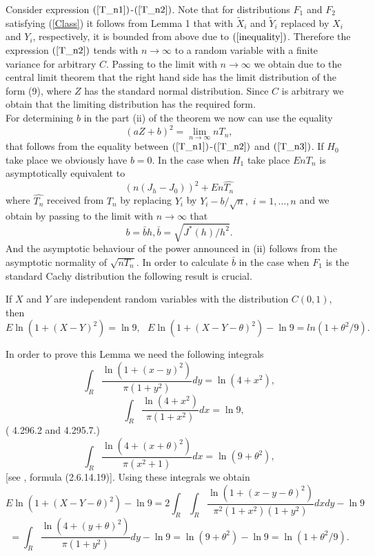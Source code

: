 \documentclass{svproc}
\begin{document}
Consider expression $(\ref{T_n1})$-$(\ref{T_n2})$. Note  that for distributions $F_1$ and $F_2$  satisfying (\ref{Class}) it follows from Lemma 1 that  with $\tilde X_i$ and $\tilde Y_i$ replaced by $X_i$ and $Y_i$, respectively, it is bounded from above due to  $(\ref{inequality})$. Therefore  the expression $(\ref{T_n2})$ tends with $n\to \infty$ to a random variable with a finite variance for arbitrary $C$.
Passing to the limit with $n\to \infty$ we obtain due to the central limit theorem that the right hand side has the limit distribution of the form (9), where  $Z$ has the standard normal distribution.  Since $C$ is arbitrary we obtain that the limiting distribution has the required form. \\
For determining $b$ in the part (ii) of the theorem  we now can use the equality
 \begin{equation}\label{identity}
 (aZ+b)^2=\lim_{n \to \infty}
 nT_n,
 \end{equation}
 that follows from  the equality between $(\ref{T_n1})$-$(\ref{T_n2})$ and $(\ref{T_n3})$. If $H_0$ take place we obviously have $b=0$. In the case when $H_1$ take place $EnT_n$ is asymptotically equivalent to  
$$
(n(J_h - J_0))^2+En\hat{T_n}
$$
where $\hat{T_n}$ received from $T_n$ by replacing  $Y_i$ by $Y_i - b/\sqrt{n},$ $i=1,\dots,n$
and we obtain by passing to the limit with $n\to\infty$ that 
$$
b= \bar bh, 
\bar b =\sqrt{J^*(h)/h^2}.
$$ 
 And the asymptotic behaviour of the power announced in (ii) follows from the asymptotic normality of $\sqrt{nT_n}$.
In order to calculate $\bar b$ in the case when $F_1$ is the standard Cachy distribution
 the following result is crucial.
\begin{lemma}If $X$ and $Y$ are independent random variables with the distribution
$C(0,1)$, then
$$
 E \ln(1+ (X- Y)^2)= \ln 9,\,\,\,\,
 E \ln(1+ (X- Y - \theta)^2)-\ln 9
 =
ln(1+ \theta^2/9).
$$
\end{lemma}
In order to prove this Lemma we need the following integrals
$$
\int_{R}
\frac {\ln(1+(x-y)^2)}{\pi(1+y^2)} dy = \ln(4+x^2),
$$
$$
\quad \int_{R} \frac {\ln(4+x^2)}{\pi(1+x^2)} dx = \ln 9,
$$
(\cite{GradRyzh2007}  4.296.2 and 4.295.7.)
$$
\int_{R} \frac{\ln(4 +(x +\theta)^2 )}{\pi(x^2 +1)} dx = \ln(9+\theta^2),
$$
[see  \cite{PrudBrychMarich1981}, formula (2.6.14.19)].
Using these integrals we obtain
$$
 E \ln(1+ (X- Y - \theta)^2)-\ln 9  = 2\int_{R} \int_{R} \frac{\ln(1+(x-y-\theta)^2)}{\pi^2(1+x^2)(1+y^2)} dx dy -\ln 9
$$
$$
= \int_{R}\frac{\ln(4 +(y+\theta)^2)}{\pi(1+y^2)} dy- \ln 9= \ln(9+\theta^2) -\ln 9 = \ln(1+ \theta^2/9).
$$
\end{document}
